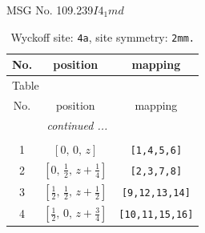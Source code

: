 \documentclass[fleqn,8pt]{jsarticle}
\begin{document}
\setcounter{MaxMatrixCols}{32}

\renewcommand{\tablename}{Table~}
\renewcommand{\figurename}{Figure~}
\begin{center}
\LARGE
MSG No. 109.239\quad$I4_{1}md$
\end{center}
\renewcommand{\arraystretch}{1.2}
\begin{longtable}{ccc}
\caption{Wyckoff site: {\tt 4a}, site symmetry: {\tt 2mm.}}
 \\
 \hline \hline
No. & position & mapping \\ \hline \endfirsthead

\multicolumn{2}{l}{\tablename\ \thetable{}} \\
 \hline \hline
No. & position & mapping \\ \hline \endhead

 \hline \hline
\multicolumn{2}{r}{\footnotesize\it continued ...} \\ \endfoot

 \hline \hline
\multicolumn{2}{r}{} \\ \endlastfoot

1 & $\left[ 0,\, 0,\, z \right]$ & {\tt [1,4,5,6]} \\ \hline
2 & $\left[ 0,\, \frac{1}{2},\, z + \frac{1}{4} \right]$ & {\tt [2,3,7,8]} \\ \hline
3 & $\left[ \frac{1}{2},\, \frac{1}{2},\, z + \frac{1}{2} \right]$ & {\tt [9,12,13,14]} \\ \hline
4 & $\left[ \frac{1}{2},\, 0,\, z + \frac{3}{4} \right]$ & {\tt [10,11,15,16]} \\
\end{longtable}
\renewcommand{\arraystretch}{1.2}
\end{document}
